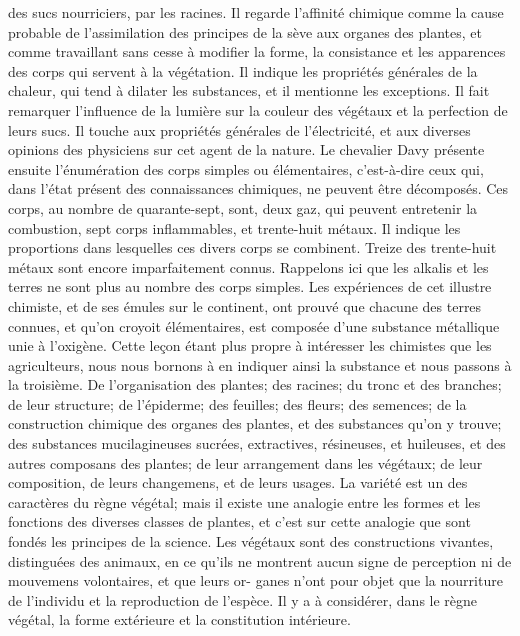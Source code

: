 \setcounter{page}{372} des sucs nourriciers, par les racines. Il regarde l'affinité chimique comme la cause probable de l'assimilation des principes de la sève aux organes des plantes, et comme travaillant sans cesse à modifier la forme, la consistance et les apparences des corps qui servent à la végétation. Il indique les propriétés générales de la chaleur, qui tend à dilater les substances, et il mentionne les exceptions. Il fait remarquer l'influence de la lumière sur la couleur des végétaux et la perfection de leurs sucs. Il touche aux propriétés générales de l'électricité, et aux diverses opinions des physiciens sur cet agent de la nature.
Le chevalier Davy présente ensuite l'énumération des corps simples ou élémentaires, c'est-à-dire ceux qui, dans l'état présent des connaissances chimiques, ne peuvent être décomposés. Ces corps, au nombre de quarante-sept, sont, deux gaz, qui peuvent entretenir la combustion, sept corps inflammables, et trente-huit métaux. Il indique les proportions dans lesquelles ces divers corps se combinent. Treize des trente-huit métaux sont encore imparfaitement connus. Rappelons ici que les alkalis et les terres ne sont plus au nombre des corps simples. Les expériences de cet illustre chimiste, et de ses émules sur le continent, ont prouvé\setcounter{page}{373} que chacune des terres connues, et qu'on croyoit élémentaires, est composée d'une substance métallique unie à l'oxigène.
Cette leçon étant plus propre à intéresser les chimistes que les agriculteurs, nous nous bornons à en indiquer ainsi la substance et nous passons à la troisième.
De l'organisation des plantes; des racines; du tronc et des branches; de leur structure; de l'épiderme; des feuilles; des fleurs; des semences; de la construction chimique des organes des plantes, et des substances qu'on y trouve; des substances mucilagineuses sucrées, extractives, résineuses, et huileuses, et des autres composans des plantes; de leur arrangement dans les végétaux; de leur composition, de leurs changemens, et de leurs usages.
La variété est un des caractères du règne végétal; mais il existe une analogie entre les formes et les fonctions des diverses classes de plantes, et c'est sur cette analogie que sont fondés les principes de la science. Les végétaux sont des constructions vivantes, distinguées des animaux, en ce qu'ils ne montrent aucun signe de perception ni de mouvemens volontaires, et que leurs or-\setcounter{page}{374} ganes n'ont pour objet que la nourriture de l'individu et la reproduction de l'espèce. Il y a à considérer, dans le règne végétal, la forme extérieure et la constitution intérieure.
